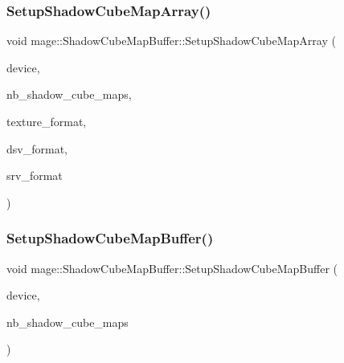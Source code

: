 \subsubsection{\texorpdfstring{Setup\+Shadow\+Cube\+Map\+Array()}{SetupShadowCubeMapArray()}}
{\footnotesize\ttfamily void mage\+::\+Shadow\+Cube\+Map\+Buffer\+::\+Setup\+Shadow\+Cube\+Map\+Array (\begin{DoxyParamCaption}\item[{I\+D3\+D11\+Device2 $\ast$}]{device,  }\item[{size\+\_\+t}]{nb\+\_\+shadow\+\_\+cube\+\_\+maps,  }\item[{D\+X\+G\+I\+\_\+\+F\+O\+R\+M\+AT}]{texture\+\_\+format,  }\item[{D\+X\+G\+I\+\_\+\+F\+O\+R\+M\+AT}]{dsv\+\_\+format,  }\item[{D\+X\+G\+I\+\_\+\+F\+O\+R\+M\+AT}]{srv\+\_\+format }\end{DoxyParamCaption})\hspace{0.3cm}{\ttfamily [private]}}

\hypertarget{structmage_1_1_shadow_cube_map_buffer_acbdfc3eaf61ba5b4638033b804f90e86}{}\label{structmage_1_1_shadow_cube_map_buffer_acbdfc3eaf61ba5b4638033b804f90e86} 
\subsubsection{\texorpdfstring{Setup\+Shadow\+Cube\+Map\+Buffer()}{SetupShadowCubeMapBuffer()}}
{\footnotesize\ttfamily void mage\+::\+Shadow\+Cube\+Map\+Buffer\+::\+Setup\+Shadow\+Cube\+Map\+Buffer (\begin{DoxyParamCaption}\item[{I\+D3\+D11\+Device2 $\ast$}]{device,  }\item[{size\+\_\+t}]{nb\+\_\+shadow\+\_\+cube\+\_\+maps }\end{DoxyParamCaption})\hspace{0.3cm}{\ttfamily [private]}}

\hypertarget{structmage_1_1_shadow_cube_map_buffer_a612f25e151e575a7266b41ddb6a072cf}{}\label{structmage_1_1_shadow_cube_map_buffer_a612f25e151e575a7266b41ddb6a072cf} 
